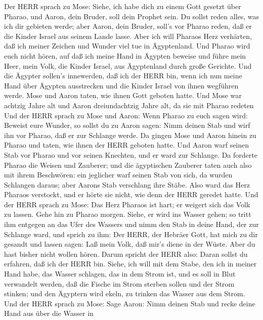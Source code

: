  Der HERR sprach zu Mose: Siehe, ich habe dich zu einem Gott
gesetzt über Pharao, und Aaron, dein Bruder, soll dein Prophet sein.
 Du sollst reden alles, was ich dir gebieten werde; aber
Aaron, dein Bruder, soll's vor Pharao reden, daß er die Kinder Israel
aus seinem Lande lasse.  Aber ich will Pharaos Herz
verhärten, daß ich meiner Zeichen und Wunder viel tue in Ägyptenland.
 Und Pharao wird euch nicht hören, auf daß ich meine Hand in
Ägypten beweise und führe mein Heer, mein Volk, die Kinder Israel, aus
Ägyptenland durch große Gerichte.  Und die Ägypter sollen's
innewerden, daß ich der HERR bin, wenn ich nun meine Hand über Ägypten
ausstrecken und die Kinder Israel von ihnen wegführen werde.
 Mose und Aaron taten, wie ihnen Gott geboten hatte.
 Und Mose war achtzig Jahre alt und Aaron dreiundachtzig
Jahre alt, da sie mit Pharao redeten  Und der HERR sprach zu
Mose und Aaron:  Wenn Pharao zu euch sagen wird: Beweist
eure Wunder, so sollst du zu Aaron sagen: Nimm deinen Stab und wirf ihn
vor Pharao, daß er zur Schlange werde.  Da gingen Mose und
Aaron hinein zu Pharao und taten, wie ihnen der HERR geboten hatte. Und
Aaron warf seinen Stab vor Pharao und vor seinen Knechten, und er ward
zur Schlange.  Da forderte Pharao die Weisen und Zauberer;
und die ägyptischen Zauberer taten auch also mit ihrem Beschwören:
 ein jeglicher warf seinen Stab von sich, da wurden
Schlangen daraus; aber Aarons Stab verschlang ihre Stäbe. 
Also ward das Herz Pharaos verstockt, und er hörte sie nicht, wie denn
der HERR geredet hatte.  Und der HERR sprach zu Mose: Das
Herz Pharaos ist hart; er weigert sich das Volk zu lassen. 
Gehe hin zu Pharao morgen. Siehe, er wird ins Wasser gehen; so tritt ihm
entgegen an das Ufer des Wassers und nimm den Stab in deine Hand, der
zur Schlange ward,  und sprich zu ihm: Der HERR, der
Hebräer Gott, hat mich zu dir gesandt und lassen sagen: Laß mein Volk,
daß mir's diene in der Wüste. Aber du hast bisher nicht wollen hören.
 Darum spricht der HERR also: Daran sollst du erfahren, daß
ich der HERR bin. Siehe, ich will mit dem Stabe, den ich in meiner Hand
habe, das Wasser schlagen, das in dem Strom ist, und es soll in Blut
verwandelt werden,  daß die Fische im Strom sterben sollen
und der Strom stinken; und den Ägyptern wird ekeln, zu trinken das
Wasser aus dem Strom.  Und der HERR sprach zu Mose: Sage
Aaron: Nimm deinen Stab und recke deine Hand aus über die Wasser in
